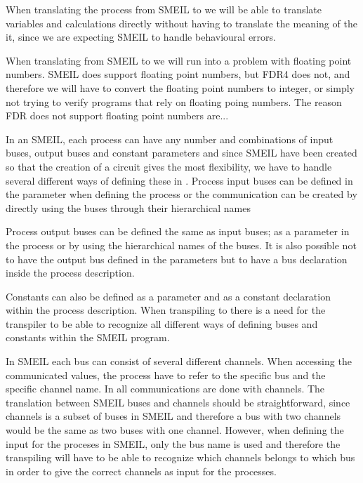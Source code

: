 When translating the process from SMEIL to \cspm we will be able to translate variables and calculations directly without having to translate the meaning of the it, since we are expecting SMEIL to handle behavioural errors.

When translating from SMEIL to \cspm we will run into a problem with floating point numbers. SMEIL does support floating point numbers, but FDR4 does not, %
and therefore we will have to convert the floating point numbers to integer, or simply not trying to verify programs that rely on floating poing numbers. The reason FDR does not support floating point numbers are... %


In an SMEIL, each process can have any number and combinations of input buses, output buses and constant parameters and since SMEIL have been created so that the creation of a circuit gives the most flexibility, we have to handle several different ways of defining these in \cspm.
Process input buses can be defined in the parameter when defining the process or the communication can be created by directly using the buses through their hierarchical names %

Process output buses can be defined the same as input buses; as a parameter in the process or by using the hierarchical names of the buses. It is also possible not to have the output bus defined in the parameters but to have a bus declaration inside the process description.

Constants can also be defined as a parameter and as a constant declaration within the process description. %
When transpiling to \cspm there is a need for the transpiler to be able to recognize all different ways of defining buses and constants within the SMEIL program.

In SMEIL each bus can consist of several different channels. When accessing the communicated values, the process have to refer to the specific bus and the specific channel name. In \cspm all communications are done with channels. The translation between SMEIL buses and \cspm channels should be straightforward, since channels is a subset of buses in SMEIL and therefore a bus with two channels would be the same as two buses with one channel. However, when defining the input for the proceses in SMEIL, only the bus name is used and therefore the transpiling will have to be able to recognize which channels belongs to which bus in order to give the correct channels as input for the \cspm processes.


